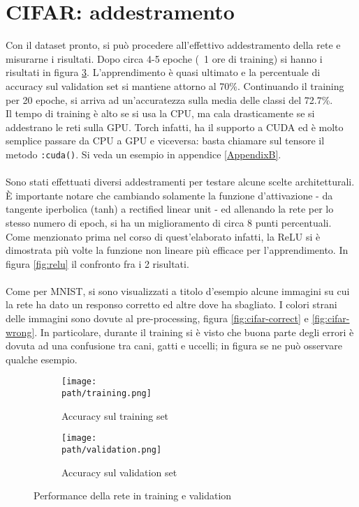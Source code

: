 \section{CIFAR: addestramento}
Con il dataset pronto, si può procedere all'effettivo addestramento della rete e misurarne i risultati. Dopo circa 4-5 epoche (~1 ore di training) si hanno i risultati in figura \ref{fig:cifar-compare}. L'apprendimento è quasi ultimato e la percentuale di accuracy sul validation set si mantiene attorno al 70\%. Continuando il training per 20 epoche, si arriva ad un'accuratezza sulla media delle classi del 72.7\%. \\
Il tempo di training è alto se si usa la CPU, ma cala drasticamente se si addestrano le reti sulla GPU. Torch infatti, ha il supporto a CUDA \parencite{cuda} ed è molto semplice passare da CPU a GPU e viceversa: basta chiamare sul tensore il metodo \texttt{:cuda()}. Si veda un esempio in appendice \ref{AppendixB}. 
\\
\\
Sono stati effettuati diversi addestramenti per testare alcune scelte architetturali. È importante notare che cambiando solamente la funzione d'attivazione - da tangente iperbolica (tanh) a rectified linear unit - ed allenando la rete per lo stesso numero di epoch, si ha un miglioramento di circa 8 punti percentuali. Come menzionato prima nel corso di quest'elaborato infatti, la ReLU si è dimostrata più volte la funzione non lineare più efficace per l'apprendimento. In figura \ref{fig:relu} il confronto fra i 2 risultati.
\\
\\
Come per MNIST, si sono visualizzati a titolo d'esempio alcune immagini su cui la rete ha dato un responso corretto ed altre dove ha sbagliato. I colori strani delle immagini sono dovute al pre-processing, figura \ref{fig:cifar-correct} e \ref{fig:cifar-wrong}. In particolare, durante il training si è visto che buona parte degli errori è dovuta ad una confusione tra cani, gatti e uccelli; in figura se ne può osservare qualche esempio.
\newpage

\begin{figure}
\centering
\begin{subfigure}{.5\textwidth}
  \centering
 \texttt{[image: \\path/training.png]} 
  \caption{Accuracy sul training set}
 \label{fig:training}
\end{subfigure}%
\begin{subfigure}{.5\textwidth}
  \centering
 \texttt{[image: \\path/validation.png]} 
  \caption{Accuracy sul validation set}
 \label{fig:validation}
\end{subfigure}
\caption{Performance della rete in training e validation}
\label{fig:cifar-compare}
\end{figure} 

